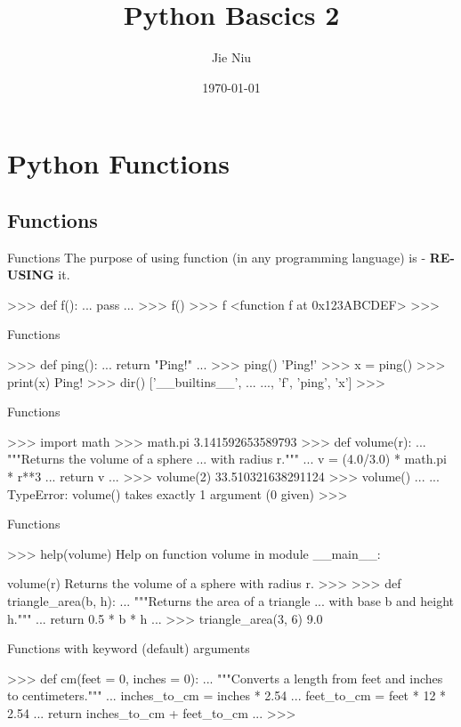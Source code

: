 \documentclass{beamer}
\title{Python Bascics 2}
\author{Jie Niu}
\institute{IGWES, JNU}
\date{\today}
\begin{document}
\begin{frame}
  \titlepage
\end{frame}

\section{Python Functions}
\subsection{Functions}

\begin{frame}[fragile]{Functions}
The purpose of using function (in any programming language) is - \textbf{RE-USING} it.\\
\begin{pythoncode}
>>> def f():
...     pass
...
>>> f()
>>> f
<function f at 0x123ABCDEF>
>>>
\end{pythoncode}
\end{frame}

\begin{frame}[fragile]{Functions}
\begin{pythoncode}
>>> def ping():
...     return "Ping!"
...
>>> ping()
'Ping!'
>>> x = ping()
>>> print(x)
Ping!
>>> dir()
['__builtins__', ... ..., 'f', 'ping', 'x']
>>>
\end{pythoncode}
\end{frame}

\begin{frame}[fragile]{Functions}
\begin{pythoncode}
>>> import math
>>> math.pi
3.141592653589793
>>> def volume(r):
...     """Returns the volume of a sphere 
...        with radius r."""
...     v = (4.0/3.0) * math.pi * r**3
...     return v
...
>>> volume(2)
33.510321638291124
>>> volume()
... ...
TypeError: volume() takes exactly 1 argument (0 given)
>>>
\end{pythoncode}
\end{frame}

\begin{frame}[fragile]{Functions}
\begin{pythoncode}
>>> help(volume)
Help on function volume in module __main__:

volume(r)
Returns the volume of a sphere with radius r.
>>>
>>> def triangle_area(b, h):
...     """Returns the area of a triangle
...        with base b and height h."""
...     return 0.5 * b * h
...
>>> triangle_area(3, 6)
9.0
\end{pythoncode}
\end{frame}

\begin{frame}[fragile]{Functions with keyword (default) arguments}
\begin{pythoncode}
>>> def cm(feet = 0, inches = 0):
...     """Converts a length from feet and inches to centimeters."""
...     inches_to_cm = inches * 2.54
...     feet_to_cm = feet * 12 * 2.54
...     return inches_to_cm + feet_to_cm
...
>>> 
\end{pythoncode}
\end{frame}
\end{document}
